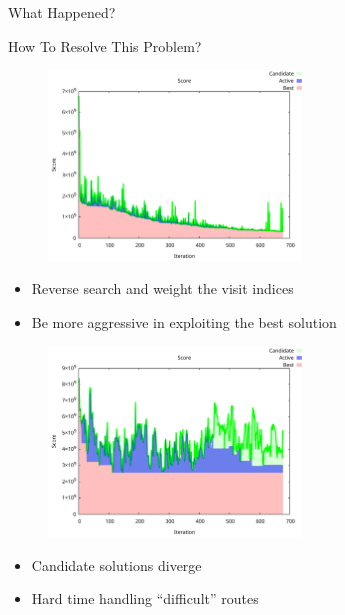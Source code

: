 \documentclass[aspectratio=169]{beamer}
\begin{document}
\begin{frame}[label={sec:org0ed7b05}]{What Happened?}
\end{frame}
\begin{frame}[label={sec:org78941b9}]{How To Resolve This Problem?}
\begin{figure}[htpb]
\centering
    \includegraphics[width=0.6\textwidth]{img/score-convergence}
\end{figure}

\begin{itemize}
\item Reverse search and weight the visit indices
\item Be more aggressive in exploiting the best solution
\end{itemize}

\begin{figure}[htpb]
\centering
    \includegraphics[width=0.6\textwidth]{img/score-diverge}
\end{figure}

\begin{itemize}
\item Candidate solutions diverge
\item Hard time handling ``difficult'' routes
\end{itemize}
\end{frame}
\end{document}
